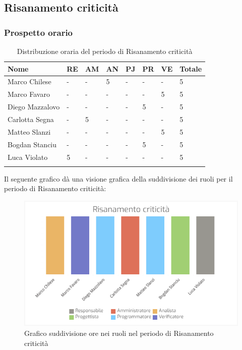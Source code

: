 \subsection{Risanamento criticità}
\subsubsection{Prospetto orario}
\begin{longtable}{|C{.30\textwidth}|C{.06\textwidth}|C{.06\textwidth}|C{.06\textwidth} | C{.06\textwidth}| C{.06\textwidth} | C{.06\textwidth} | C{.10\textwidth} |}
	\hline
	\textbf{Nome} & \textbf{RE} & \textbf{AM} & \textbf{AN} & \textbf{PJ} & \textbf{PR} & \textbf{VE} & \textbf{Totale}\\
	\hline 
	Marco Chilese & - & - & 5 & - & - & - & 5 \\
	\hline
	Marco Favaro & - & - & - & - & - & 5 & 5 \\
	\hline
	Diego Mazzalovo & - & - & - & - & 5 & - & 5 \\
	\hline
	Carlotta Segna & - & 5 & - & - & - & - & 5 \\
	\hline
	Matteo Slanzi & - & - & - & - & - & 5 & 5 \\
	\hline
	Bogdan Stanciu & - & - & - & - & 5 & - & 5 \\
	\hline
	Luca Violato & 5 & - & - & - & - & - & 5 \\   
	\hline
	
	
	\caption{Distribuzione oraria del periodo di Risanamento criticità}
	\label{Distribuzione oraria del periodo di Risanamento criticità}
\end{longtable}

Il seguente grafico dà una visione grafica della suddivisione dei ruoli per il periodo di Risanamento criticità:\begin{figure}[H]
	\centering
	\includegraphics[width=1\linewidth]{./images/Bar_risanamento_criticita3.png}
	\caption{Grafico suddivisione ore nei ruoli nel periodo di Risanamento criticità}
	\label{fig:grafico suddivione ruoli nel periodo di Risanamento criticità}
\end{figure}


